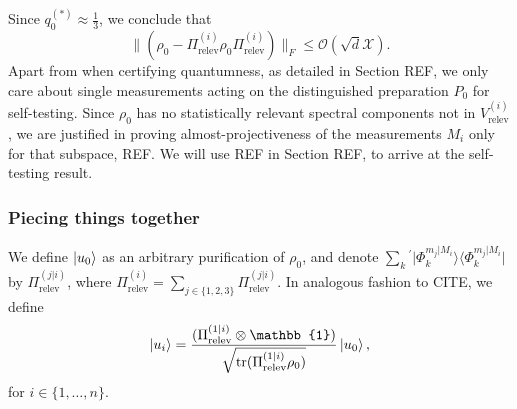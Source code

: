 Since $q_0^{(*)}\approx\frac{1}{3}$, we conclude that
\begin{equation}
\|(\rho_{0}-\Pi_{\text{relev}}^{(i)}\rho_{0}\Pi_{\text{relev}}^{(i)})\|_F \leq \mathcal{O}(\sqrt{d}\mathcal{X}).
\end{equation}
Apart from when certifying quantumness, as detailed in Section REF, we only care about single measurements acting on the distinguished preparation $P_0$ for self-testing. Since $\rho_0$ has no statistically relevant spectral components not in $V_{\text{relev}}^{(i)}$, we are justified in proving almost-projectiveness of the measurements $M_i$ only for that subspace, REF. We will use REF in Section REF, to arrive at the self-testing result.
\subsubsection{Piecing things together}
We define $\ket{u_0}$ as an arbitrary purification of $\rho_0$, and denote $\sum_{k}{}^{'}\vert \Phi_k^{m_j\vert M_i}\rangle \langle \Phi_k^{m_j\vert M_i}\vert$ by $\Pi_{\text{relev}}^{(j\vert i)}$, where $\Pi_{\text{relev}}^{(i)}=\sum_{j\in\{1,2,3\}}\Pi_{\text{relev}}^{(j\vert i)}$. In analogous fashion to CITE, we define
\begin{equation}
\ket{u_i} = \frac{(\Pi_{\text{relev}}^{(1\vert i)}\otimes\mathbb{1})}{\sqrt{\operatorname{tr}(\Pi_{\text{relev}}^{(1\vert i)}\rho_0)}}\ket{u_0},
\end{equation}
for $i\in\{1,\dots,n\}$.
